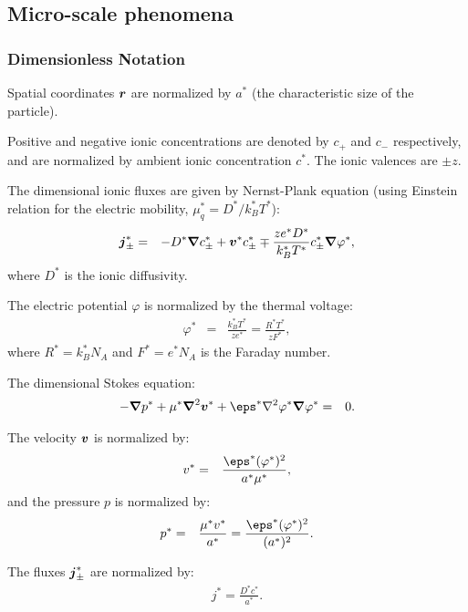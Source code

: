 \subsection{Micro-scale phenomena}

\subsubsection{Dimensionless Notation}

Spatial coordinates $\boldsymbol{r}$ are normalized by $a^*$ (the characteristic size of the particle).

Positive and negative ionic concentrations are denoted by $c_+$ and $c_-$ respectively, and
are normalized by ambient ionic concentration $c^*$. The ionic valences are $\pm z$.

The dimensional ionic fluxes are given by Nernst-Plank equation 
(using Einstein relation for the electric mobility, $\mu_q^* = D^* / k_B^* T^*$):
\begin{eqnarray}
\boldsymbol{j}^*_\pm &=& 
-D^* \boldsymbol{\nabla} c^*_\pm + \boldsymbol{v}^* c^*_\pm \mp \frac{z e^* D^*}{k_B^* T^*} c^*_\pm \boldsymbol{\nabla} \varphi^*,
\end{eqnarray}
where $D^*$ is the ionic diffusivity.

The electric potential $\varphi$ is normalized by the thermal voltage:
\begin{eqnarray}
\varphi^* &=& \frac{k_B^* T^*}{z e^*} = \frac{R^* T^*}{z F^*},
\end{eqnarray}
where $R^* = k_B^* N_A$ and $F^* = e^* N_A$ is the Faraday number.

The dimensional Stokes equation:
\begin{eqnarray}
-\bnabla p^* + \mu^* \bLaplacian \bv^* + \eps^* \Laplacian \varphi^* \bnabla \varphi^* &=& 0.
\end{eqnarray}

The velocity $\boldsymbol{v}$ is normalized by:
\begin{eqnarray}
v^* &=& \frac{\eps^* (\varphi^*)^2}{a^* \mu^*},
\end{eqnarray}
and the pressure $p$ is normalized by:
\begin{eqnarray}
p^* &=& \frac{\mu^* v^*}{a^*} = \frac{\eps^* (\varphi^*)^2}{(a^*)^2}.
\end{eqnarray}

The fluxes $\boldsymbol{j}^*_\pm$ are normalized by:
\begin{eqnarray}
j^* = \frac{D^* c^*}{a^*}.
\end{eqnarray}


